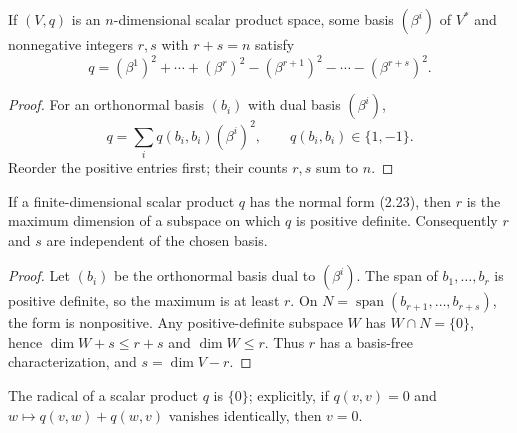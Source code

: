 \begin{corollary}
\label{cor:scalar-product-signature-form}





If $(V,q)$ is an $n$-dimensional scalar product space, some basis $(\beta^i)$ of
$V^*$ and nonnegative integers $r,s$ with $r+s=n$ satisfy
\begin{equation}
q=(\beta^1)^2+\cdots+(\beta^r)^2
 -(\beta^{r+1})^2-\cdots-(\beta^{r+s})^2. \tag{2.23}
\end{equation}
\end{corollary}

\begin{proof}

\sketch For an orthonormal basis $(b_i)$ with dual basis $(\beta^i)$,
\[
q=\sum_iq(b_i,b_i)(\beta^i)^2,
\qquad q(b_i,b_i)\in\{1,-1\}.
\]
Reorder the positive entries first; their counts $r,s$ sum to $n$.
\end{proof}

\begin{proposition}
\label{prop:sylvesters-law-inertia}





If a finite-dimensional scalar product $q$ has the normal form (2.23), then $r$
is the maximum dimension of a subspace on which $q$ is positive definite.
Consequently $r$ and $s$ are independent of the chosen basis.
\end{proposition}

\begin{proof}

\sketch Let $(b_i)$ be the orthonormal basis dual to $(\beta^i)$. The span of
$b_1,\ldots,b_r$ is positive definite, so the maximum is at least $r$. On
$N=\operatorname{span}(b_{r+1},\ldots,b_{r+s})$, the form is nonpositive. Any
positive-definite subspace $W$ has $W\cap N=\{0\}$, hence
$\dim W+s\leq r+s$ and $\dim W\leq r$. Thus $r$ has a basis-free
characterization, and $s=\dim V-r$.
\end{proof}

\begin{lemma}
\label{lem:radical-scalar-product-trivial}





The radical of a scalar product $q$ is $\{0\}$; explicitly, if $q(v,v)=0$ and
$w\mapsto q(v,w)+q(w,v)$ vanishes identically, then $v=0$.
\end{lemma}

